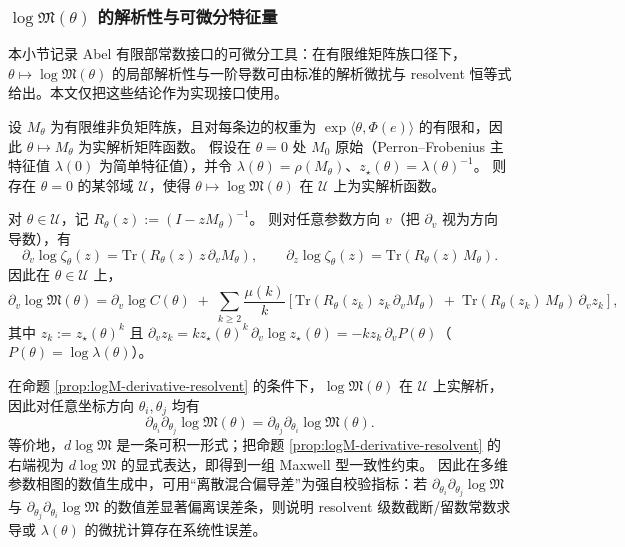 \subsubsection{\texorpdfstring{$\log\mathfrak{M}(\theta)$}{logM(theta)} 的解析性与可微分特征量}\label{subsec:logM-analyticity}
本小节记录 Abel 有限部常数接口的可微分工具：在有限维矩阵族口径下，$\theta\mapsto\log\mathfrak{M}(\theta)$ 的局部解析性与一阶导数可由标准的解析微扰与 resolvent 恒等式给出。本文仅把这些结论作为实现接口使用。

\begin{remark}\label{prop:logM-analytic}
设 $M_\theta$ 为有限维非负矩阵族，且对每条边的权重为 $\exp\langle\theta,\Phi(e)\rangle$ 的有限和，因此 $\theta\mapsto M_\theta$ 为实解析矩阵函数。
假设在 $\theta=0$ 处 $M_0$ 原始（Perron--Frobenius 主特征值 $\lambda(0)$ 为简单特征值），并令 $\lambda(\theta)=\rho(M_\theta)$、$z_\star(\theta)=\lambda(\theta)^{-1}$。
则存在 $\theta=0$ 的某邻域 $\mathcal{U}$，使得 $\theta\mapsto\log\mathfrak{M}(\theta)$ 在 $\mathcal{U}$ 上为实解析函数。
\end{remark}

\begin{remark}\label{prop:logM-derivative-resolvent}
对 $\theta\in\mathcal{U}$，记 $R_\theta(z):=(I-zM_\theta)^{-1}$。
则对任意参数方向 $v$（把 $\partial_v$ 视为方向导数），有
\[
\partial_v\log\zeta_\theta(z)=\mathrm{Tr}\!\left(R_\theta(z)\,z\,\partial_v M_\theta\right),
\qquad
\partial_z\log\zeta_\theta(z)=\mathrm{Tr}\!\left(R_\theta(z)\,M_\theta\right).
\]
因此在 $\theta\in\mathcal{U}$ 上，
\[
\partial_v\log\mathfrak{M}(\theta)
=
\partial_v\log C(\theta)
\;+\;
\sum_{k\ge 2}\frac{\mu(k)}{k}\left[
\mathrm{Tr}\!\left(R_\theta(z_k)\,z_k\,\partial_v M_\theta\right)
\;+\;
\mathrm{Tr}\!\left(R_\theta(z_k)\,M_\theta\right)\,\partial_v z_k
\right],
\]
其中 $z_k:=z_\star(\theta)^k$ 且 $\partial_v z_k = k z_\star(\theta)^k\,\partial_v\log z_\star(\theta)=-k z_k\,\partial_v P(\theta)$（$P(\theta)=\log\lambda(\theta)$）。
\end{remark}

\begin{remark}\label{cor:logM-maxwell}
在命题 \ref{prop:logM-derivative-resolvent} 的条件下，$\log\mathfrak{M}(\theta)$ 在 $\mathcal{U}$ 上实解析，
因此对任意坐标方向 $\theta_i,\theta_j$ 均有
\[
\partial_{\theta_i}\partial_{\theta_j}\log\mathfrak{M}(\theta)=\partial_{\theta_j}\partial_{\theta_i}\log\mathfrak{M}(\theta).
\]
等价地，$d\log\mathfrak{M}$ 是一条可积一形式；把命题 \ref{prop:logM-derivative-resolvent} 的右端视为 $d\log\mathfrak{M}$ 的显式表达，即得到一组 Maxwell 型一致性约束。
因此在多维参数相图的数值生成中，可用“离散混合偏导差”为强自校验指标：若
\(
\partial_{\theta_i}\partial_{\theta_j}\log\mathfrak{M}
\)
与
\(
\partial_{\theta_j}\partial_{\theta_i}\log\mathfrak{M}
\)
的数值差显著偏离误差条，则说明 resolvent 级数截断/留数常数求导或 $\lambda(\theta)$ 的微扰计算存在系统性误差。
\end{remark}

